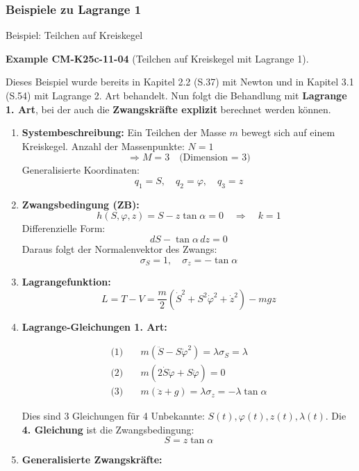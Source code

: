 \documentclass[10pt, letterpaper]{article}
\newcommand{\CustomHeading}[3]{%
  \par\medskip\noindent%
  \textbf{#1 #2} \textnormal{(#3)}.\enskip%
}
\newenvironment{EXA}[2]{\begin{unitbox}\CustomHeading{Example}{#1}{#2}}{\end{unitbox}}
\begin{document}
\subsubsection{Beispiele zu Lagrange 1}

Beispiel: Teilchen auf Kreiskegel


\begin{EXA}{CM-K25c-11-04}{Teilchen auf Kreiskegel mit Lagrange 1}
Dieses Beispiel wurde bereits in Kapitel 2.2 (S.37) mit Newton und in Kapitel 3.1 (S.54) mit Lagrange 2. Art behandelt.  
Nun folgt die Behandlung mit \textbf{Lagrange 1. Art}, bei der auch die \textbf{Zwangskräfte explizit} berechnet werden können.

\begin{enumerate}[label=\textbf{\arabic*)}, itemsep=1.5em]

\item \textbf{Systembeschreibung:}  
Ein Teilchen der Masse \( m \) bewegt sich auf einem Kreiskegel.  
Anzahl der Massenpunkte: \( N = 1 \)  
\[
\Rightarrow M = 3 \quad \text{(Dimension = 3)}
\]  
Generalisierte Koordinaten:
\[
q_1 = S, \quad q_2 = \varphi, \quad q_3 = z
\]

\item \textbf{Zwangsbedingung (ZB):}
\[
h(S, \varphi, z) = S - z \tan\alpha = 0 \quad \Rightarrow \quad k = 1
\]
Differenzielle Form:
\[
dS - \tan\alpha \, dz = 0
\]
Daraus folgt der Normalenvektor des Zwangs:
\[
\sigma_S = 1, \quad \sigma_z = -\tan\alpha
\]

\item \textbf{Lagrangefunktion:}
\[
L = T - V = \frac{m}{2} \left( \dot{S}^2 + S^2 \dot{\varphi}^2 + \dot{z}^2 \right) - mgz
\]

\item \textbf{Lagrange-Gleichungen 1. Art:}

\begin{align*}
\text{(1)}\quad & m(\ddot{S} - S \dot{\varphi}^2) = \lambda \sigma_S = \lambda \\[0.5em]
\text{(2)}\quad & m(2 \dot{S} \dot{\varphi} + S \ddot{\varphi}) = 0 \\[0.5em]
\text{(3)}\quad & m(\ddot{z} + g) = \lambda \sigma_z = -\lambda \tan\alpha
\end{align*}

Dies sind 3 Gleichungen für 4 Unbekannte: \( S(t), \varphi(t), z(t), \lambda(t) \).  
Die \textbf{4. Gleichung} ist die Zwangsbedingung:
\[
S = z \tan\alpha
\]

\item \textbf{Generalisierte Zwangskräfte:}


\end{enumerate}
\end{EXA}
\end{document}
